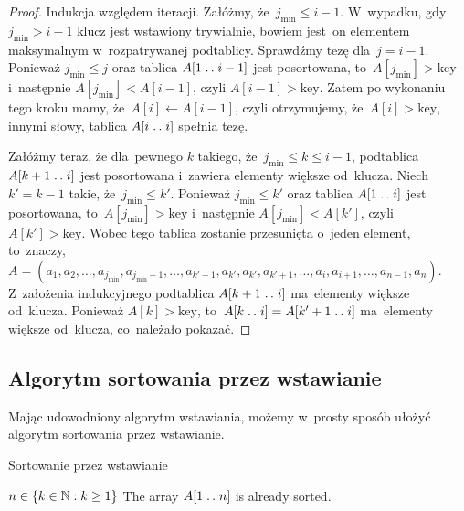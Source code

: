 \begin{proof}
    Indukcja względem iteracji.
    Załóżmy, że~\( j_{\text{min}} \le i - 1 \). W~wypadku,
    gdy~\( j_{\text{min}} > i - 1 \) klucz jest wstawiony trywialnie,
    bowiem jest~on elementem maksymalnym w~rozpatrywanej podtablicy.
    Sprawdźmy tezę dla~\( j = i - 1 \). 
    Ponieważ \( j_{\text{min}} \le j \)
    oraz tablica \( A[1 \mathrel{{.}\,{.}}\nobreak i - 1] \) jest posortowana, 
    to~\( A[j_{\text{min}}] > \text{key} \) i~następnie
    \( A[j_{\text{min}}] < A[i - 1] \), 
    czyli \( A[i - 1] > \text{key} \). 
    Zatem po wykonaniu tego kroku mamy, że~\( A[i] \gets A[i - 1] \),
    czyli otrzymujemy, że~\( A[i] > \text{key} \),
    innymi słowy, tablica \( A[i \mathrel{{.}\,{.}}\nobreak i] \) spełnia tezę.
    
    Załóżmy teraz, że dla~pewnego \( k \) takiego, 
    że~\( j_{\text{min}} \le k \le i - 1 \),
    podtablica \( A[ k + 1 \mathrel{{.}\,{.}}\nobreak i ] \)
    jest posortowana i~zawiera elementy większe od~klucza.
    Niech \( k' = k - 1 \) takie, że~\( j_{\text{min}} \le k' \).
    Ponieważ \( j_{\text{min}} \le k' \) 
    oraz tablica \( A[1 \mathrel{{.}\,{.}}\nobreak i] \) jest posortowana, 
    to~\( A[j_{\text{min}}] > \text{key} \) i~następnie
    \( A[j_{\text{min}}] < A[k'] \), czyli 
    \( A[k'] > \text{key} \). Wobec tego tablica zostanie przesunięta
    o~jeden element, to~znaczy, 
    \( A = (a_1, a_2, \dotsc, a_{j_{\text{min}}},
    a_{j_{\text{min}} + 1}, \dotsc, 
    a_{k' - 1}, a_{k'}, a_{k'}, a_{k' + 1},
    \dotsc, a_{i}, a_{i + 1}, \dotsc, a_{n - 1}, a_n) \).
    Z~założenia indukcyjnego podtablica \( A[k + 1 \mathrel{{.}\,{.}}\nobreak i] \)
    ma~elementy większe od~klucza.
    Ponieważ \( A[k] > \text{key} \), to~\( A[k \mathrel{{.}\,{.}}\nobreak i] 
    = A[k' + 1 \mathrel{{.}\,{.}}\nobreak i] \)
    ma~elementy większe od~klucza, co~należało pokazać.
\end{proof}

\subsection{Algorytm sortowania przez wstawianie}
Mając udowodniony algorytm wstawiania, możemy w~prosty sposób
ułożyć algorytm sortowania przez wstawianie.

\begin{algorithm}%
    \label{alg:insertion-sort}
    \caption{Sortowanie przez wstawianie}
    \begin{algorithmic}[1]
        \Require \( n \in \{ k \in \mathbb{N} : k \ge 1 \} \)
        \Ensure The array \( A[1 \mathrel{{.}\,{.}}\nobreak n] \) is already sorted.
            \EndFor
        \EndProcedure%
    \end{algorithmic}
\end{algorithm}


